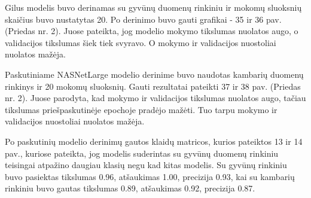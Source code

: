 \documentclass{VUMIFPSbakalaurinis}
\begin{document}
Gilus modelis buvo derinamas su gyvūnų duomenų rinkiniu ir mokomų sluoksnių skaičius buvo nustatytas 20.
Po derinimo buvo gauti grafikai - 35 ir 36 pav. (Priedas nr. 2). Juose pateikta, jog modelio mokymo tikslumas nuolatos augo, o validacijos tikslumas šiek tiek svyravo. O mokymo ir validacijos nuostoliai nuolatos mažėja.

Paskutiniame NASNetLarge modelio derinime buvo naudotas kambarių duomenų rinkinys ir 20 mokomų sluoksnių.
Gauti rezultatai pateikti 37 ir 38 pav. (Priedas nr. 2). Juose parodyta, kad mokymo ir validacijos tikslumas nuolatos augo, tačiau tikslumas priešpaskutinėje epochoje pradėjo mažėti. Tuo tarpu mokymo ir validacijos nuostoliai nuolatos mažėja.

Po paskutinių modelio derinimų gautos klaidų matricos, kurios pateiktos 13 ir 14 pav., kuriose pateikta, jog modelis suderintas su gyvūnų duomenų rinkiniu teisingai atpažino daugiau klasių negu kad kitas modelis.
Su gyvūnų rinkiniu buvo pasiektas tikslumas 0.96, atšaukimas 1.00, precizija 0.93, kai su kambarių rinkiniu buvo gautas tikslumas 0.89, atšaukimas 0.92, precizija 0.87.
\end{document}
